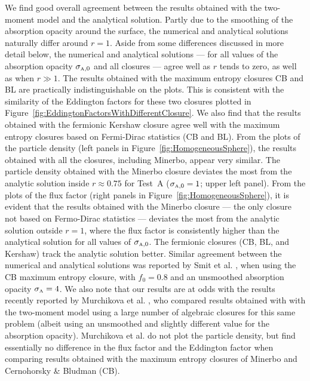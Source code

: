 We find good overall agreement between the results obtained with the two-moment model and the analytical solution.  
Partly due to the smoothing of the absorption opacity around the surface, the numerical and analytical solutions naturally differ around $r=1$.  
Aside from some differences discussed in more detail below, the numerical and analytical solutions --- for all values of the absorption opacity $\sigma_{\mbox{\tiny A},0}$ and all closures --- agree well as $r$ tends to zero, as well as when $r\gg1$.  
The results obtained with the maximum entropy closures CB and BL are practically indistinguishable on the plots.  
This is consistent with the similarity of the Eddington factors for these two closures plotted in Figure~\ref{fig:EddingtonFactorsWithDifferentClosure}.  
We also find that the results obtained with the fermionic Kershaw closure agree well with the maximum entropy closures based on Fermi-Dirac statistics (CB and BL).  
From the plots of the particle density (left panels in Figure~\ref{fig:HomogeneousSphere}), the results obtained with all the closures, including Minerbo, appear very similar.  
The particle density obtained with the Minerbo closure deviates the most from the analytic solution inside $r\approx0.75$ for Test~A ($\sigma_{\mbox{\tiny A},0}=1$; upper left panel).  
From the plots of the flux factor (right panels in Figure~\ref{fig:HomogeneousSphere}), it is evident that the results obtained with the Minerbo closure --- the only closure not based on Fermo-Dirac statistics --- deviates the most from the analytic solution outside $r=1$, where the flux factor is consistently higher than the analytical solution for all values of $\sigma_{\mbox{\tiny A},0}$.  
The fermionic closures (CB, BL, and Kershaw) track the analytic solution better.  
Similar agreement between the numerical and analytical solutions was reported by Smit et al. \cite{smit_etal_1997}, when using the CB maximum entropy closure, with $f_{0}=0.8$ and an unsmoothed absorption opacity $\sigma_{\mbox{\tiny A}}=4$.  
We also note that our results are at odds with the results recently reported by Murchikova et al. \cite{murchikova_etal_2017}, who compared results obtained with with the two-moment model using a large number of algebraic closures for this same problem (albeit using an unsmoothed and slightly different value for the absorption opacity).  
Murchikova et al. do not plot the particle density, but find essentially no difference in the flux factor and the Eddington factor when comparing results obtained with the maximum entropy closures of Minerbo and Cernohorsky \& Bludman (CB).  


